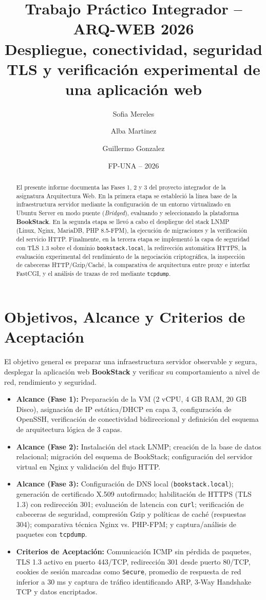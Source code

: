 \documentclass[12pt,a4paper]{article}
\title{\textbf{Trabajo Práctico Integrador -- ARQ-WEB 2026}\\Despliegue, conectividad, seguridad TLS y verificación experimental de una aplicación web}
\author{Sofia Mereles \and Alba Martinez \and Guillermo Gonzalez}
\date{FP-UNA -- 2026}
\begin{document}
\maketitle

\begin{abstract}
El presente informe documenta las Fases 1, 2 y 3 del proyecto integrador de la asignatura Arquitectura Web. En la primera etapa se estableció la línea base de la infraestructura servidor mediante la configuración de un entorno virtualizado en Ubuntu Server en modo puente (\textit{Bridged}), evaluando y seleccionando la plataforma \textbf{BookStack}. En la segunda etapa se llevó a cabo el despliegue del stack LNMP (Linux, Nginx, MariaDB, PHP 8.5-FPM), la ejecución de migraciones y la verificación del servicio HTTP. Finalmente, en la tercera etapa se implementó la capa de seguridad con TLS 1.3 sobre el dominio \texttt{bookstack.local}, la redirección automática HTTPS, la evaluación experimental del rendimiento de la negociación criptográfica, la inspección de cabeceras HTTP/Gzip/Caché, la comparativa de arquitectura entre proxy e interfaz FastCGI, y el análisis de trazas de red mediante \texttt{tcpdump}.
\end{abstract}

\tableofcontents
\newpage

\section{Objetivos, Alcance y Criterios de Aceptación}
El objetivo general es preparar una infraestructura servidor observable y segura, desplegar la aplicación web \textbf{BookStack} y verificar su comportamiento a nivel de red, rendimiento y seguridad.

\begin{itemize}
    \item \textbf{Alcance (Fase 1):} Preparación de la VM (2 vCPU, 4 GB RAM, 20 GB Disco), asignación de IP estática/DHCP en capa 3, configuración de OpenSSH, verificación de conectividad bidireccional y definición del esquema de arquitectura lógica de 3 capas.
    \item \textbf{Alcance (Fase 2):} Instalación del stack LNMP; creación de la base de datos relacional; migración del esquema de BookStack; configuración del servidor virtual en Nginx y validación del flujo HTTP.
    \item \textbf{Alcance (Fase 3):} Configuración de DNS local (\texttt{bookstack.local}); generación de certificado X.509 autofirmado; habilitación de HTTPS (TLS 1.3) con redirección 301; evaluación de latencia con \texttt{curl}; verificación de cabeceras de seguridad, compresión Gzip y políticas de caché (respuestas 304); comparativa técnica Nginx vs. PHP-FPM; y captura/análisis de paquetes con \texttt{tcpdump}.
    \item \textbf{Criterios de Aceptación:} Comunicación ICMP sin pérdida de paquetes, TLS 1.3 activo en puerto 443/TCP, redirección 301 desde puerto 80/TCP, cookies de sesión marcadas como \texttt{Secure}, promedio de respuesta de red inferior a 30 ms y captura de tráfico identificando ARP, 3-Way Handshake TCP y datos encriptados.
\end{itemize}
\end{document}
